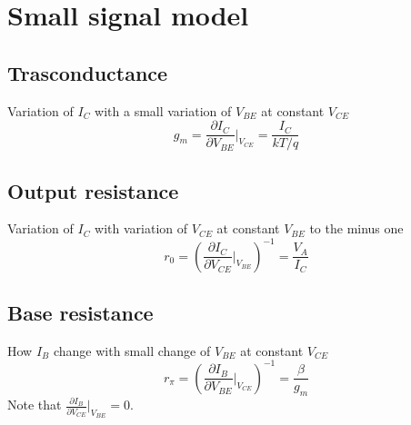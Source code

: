 \section{Small signal model}

\subsection{Trasconductance}
Variation of $I_C$ with a small variation of $V_{BE}$ at constant $V_{CE}$ 
\begin{equation}
g_m=\frac{\partial I_C}{\partial V_{BE}}|_{V_{CE}}=\frac{I_C}{kT/q}
\end{equation}

\subsection{Output resistance}
Variation of $I_C$ with variation of $V_{CE}$ at constant $V_{BE}$ to the minus one 
\begin{equation}
r_0=\left(\frac{\partial I_C}{\partial V_{CE}}|_{V_{BE}}\right)^{-1}=\frac{V_A}{I_C}
\end{equation}

\subsection{Base resistance}
How $I_B$ change with small change of $V_{BE}$ at constant $V_{CE}$
\begin{equation}
r_{\pi}=\left(\frac{\partial I_B}{\partial V_{BE}}|_{V_{CE}}\right)^{-1}=\frac{\beta}{g_m}
\end{equation}
Note that $\frac{\partial I_B}{\partial V_{CE}}|_{V_{BE}}=0$.\\

